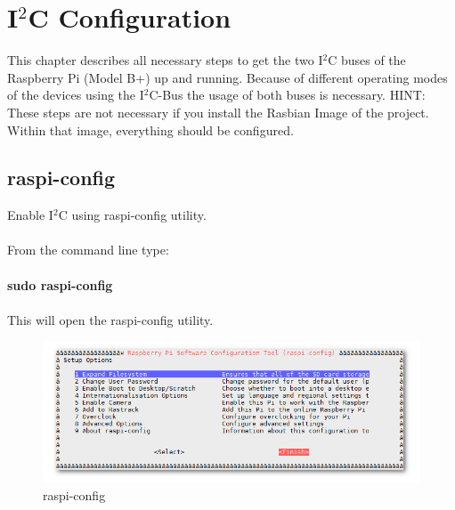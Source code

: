 \chapter{I$^2$C Configuration}
\label{chap:I2C}

This chapter describes all necessary steps to get the two I$^2$C buses of the Raspberry Pi (Model B+) up and running. Because of different operating modes of the devices using the I$^2$C-Bus the usage of both buses is necessary.\newline\newline
HINT: These steps are not necessary if you install the Rasbian Image of the project. Within that image, everything should be configured.


\section{raspi-config}
\label{sec:raspiconfig}
Enable I$^2$C using raspi-config utility.\\\\
From the command line type:\\\\
\ttfamily \textbf{sudo raspi-config}\\\\
\normalfont This will open the raspi-config utility.

\begin{figure}[H]
	\centering\includegraphics[width=\textwidth]{fig/ch-i2c_configuration/raspi_config}
	\caption{raspi-config}
	\label{fig:raspiconfig}
\end{figure}

